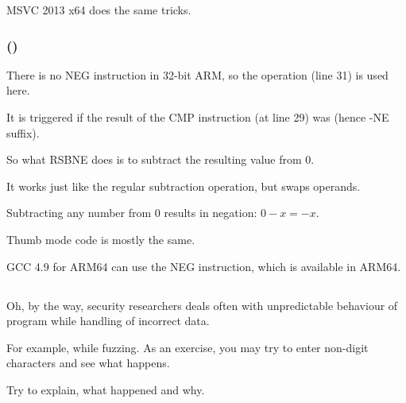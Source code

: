 \Optimizing MSVC 2013 x64 does the same tricks.

\subsubsection{\OptimizingKeilVI (\ARMMode)}



There is no NEG instruction in 32-bit ARM, so the  operation (line 31) 
is used here.

It is triggered if the result of the CMP instruction (at line 29) was  (hence -NE suffix).

So what RSBNE does is to subtract the resulting value from 0.

It works just like the regular subtraction operation, but swaps operands.

Subtracting any number from 0 results in negation: $0-x=-x$.

Thumb mode code is mostly the same.

GCC 4.9 for ARM64 can use the NEG instruction, which is available in ARM64.

\subsection{\Exercise{}}

Oh, by the way, security researchers deals often with unpredictable behaviour of program while handling of incorrect data.

For example, while fuzzing.
As an exercise, you may try to enter non-digit characters and see what happens.

Try to explain, what happened and why.



